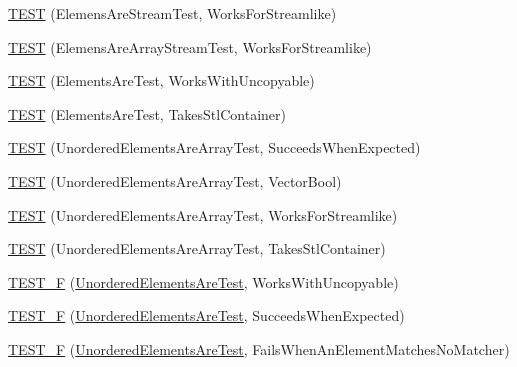 \begin{DoxyCompactItemize}
\item 
\mbox{\hyperlink{namespacetesting_1_1gmock__matchers__test_adb0f512a2369d69f056e42e1cc5f3fc2}{T\+E\+ST}} (Elemens\+Are\+Stream\+Test, Works\+For\+Streamlike)
\item 
\mbox{\hyperlink{namespacetesting_1_1gmock__matchers__test_a5cc317a80c3501cb7f53d07043b7270c}{T\+E\+ST}} (Elemens\+Are\+Array\+Stream\+Test, Works\+For\+Streamlike)
\item 
\mbox{\hyperlink{namespacetesting_1_1gmock__matchers__test_ab403dce87c2d198a4f709d7f781d03c6}{T\+E\+ST}} (Elements\+Are\+Test, Works\+With\+Uncopyable)
\item 
\mbox{\hyperlink{namespacetesting_1_1gmock__matchers__test_a290280b9e89a57833c9fc706d153b98a}{T\+E\+ST}} (Elements\+Are\+Test, Takes\+Stl\+Container)
\item 
\mbox{\hyperlink{namespacetesting_1_1gmock__matchers__test_adb7e47654f1536fc049243f765292825}{T\+E\+ST}} (Unordered\+Elements\+Are\+Array\+Test, Succeeds\+When\+Expected)
\item 
\mbox{\hyperlink{namespacetesting_1_1gmock__matchers__test_a3d7df4fa0dd3e8247f4c2d4b02d801f0}{T\+E\+ST}} (Unordered\+Elements\+Are\+Array\+Test, Vector\+Bool)
\item 
\mbox{\hyperlink{namespacetesting_1_1gmock__matchers__test_a1ff2a93a8f031a5b23dbc699a462043b}{T\+E\+ST}} (Unordered\+Elements\+Are\+Array\+Test, Works\+For\+Streamlike)
\item 
\mbox{\hyperlink{namespacetesting_1_1gmock__matchers__test_aa3a960ec78e2b1e860c305f4598f39ec}{T\+E\+ST}} (Unordered\+Elements\+Are\+Array\+Test, Takes\+Stl\+Container)
\item 
\mbox{\hyperlink{namespacetesting_1_1gmock__matchers__test_ab09132c3b991b8f104f3091370d2fe55}{T\+E\+S\+T\+\_\+F}} (\mbox{\hyperlink{classtesting_1_1gmock__matchers__test_1_1UnorderedElementsAreTest}{Unordered\+Elements\+Are\+Test}}, Works\+With\+Uncopyable)
\item 
\mbox{\hyperlink{namespacetesting_1_1gmock__matchers__test_a177c3db59da001df2441deb1ddb083af}{T\+E\+S\+T\+\_\+F}} (\mbox{\hyperlink{classtesting_1_1gmock__matchers__test_1_1UnorderedElementsAreTest}{Unordered\+Elements\+Are\+Test}}, Succeeds\+When\+Expected)
\item 
\mbox{\hyperlink{namespacetesting_1_1gmock__matchers__test_a62fd481b1160a667c785e6009ff87163}{T\+E\+S\+T\+\_\+F}} (\mbox{\hyperlink{classtesting_1_1gmock__matchers__test_1_1UnorderedElementsAreTest}{Unordered\+Elements\+Are\+Test}}, Fails\+When\+An\+Element\+Matches\+No\+Matcher)

\end{DoxyCompactItemize}
